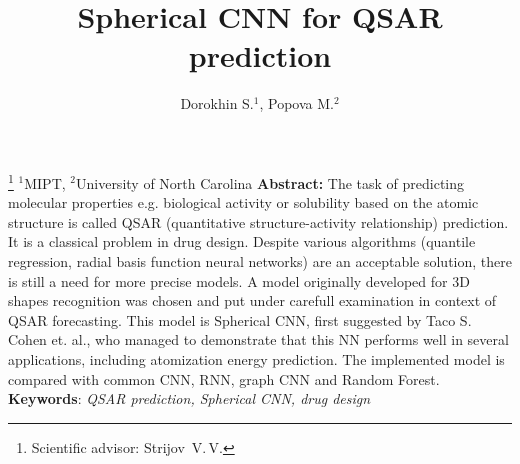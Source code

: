 \documentclass[12pt,twoside]{article}
\begin{document}
\title
{Spherical CNN for QSAR prediction}
\author
{Dorokhin S.$^1$, Popova M.$^2$} %
\thanks
{Scientific advisor:  Strijov~V.\,V.
}
\organization
{$^1$MIPT, $^2$University of North Carolina}
\abstract
{
    \textbf{Abstract:}
    The task of predicting molecular properties e.g. biological activity or solubility based on the atomic structure is called QSAR (quantitative structure-activity relationship) prediction.
    It is a classical problem in drug design.
    Despite various algorithms (quantile regression, radial basis function neural networks) are an acceptable solution, there is still a need for more precise models. 
    A model originally developed for 3D shapes recognition was chosen and put under carefull examination in context of QSAR forecasting.
    This model is Spherical CNN, first suggested by Taco S. Cohen et. al., who managed to demonstrate that this NN performs well in several applications, including atomization energy prediction.
    The implemented model is compared with common CNN, RNN, graph CNN and Random Forest.    
\bigskip
\newline
\textbf{Keywords}: \emph {QSAR prediction, Spherical CNN, drug design}
}
\maketitle
\end{document}
